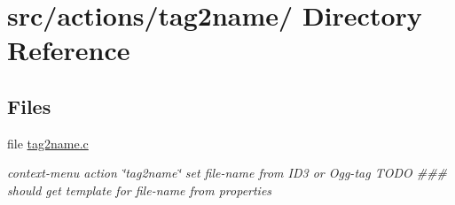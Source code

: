 \hypertarget{dir_000042}{
\section{src/actions/tag2name/ Directory Reference}
\label{dir_000042}
}
\subsection*{Files}
\begin{CompactItemize}
\item 
file \hyperlink{tag2name_8c}{tag2name.c}
\begin{CompactList}\small\item\em context-menu action \char`\"{}tag2name\char`\"{} set file-name from ID3 or Ogg-tag TODO \#\#\# should get template for file-name from properties \item\end{CompactList}

\end{CompactItemize}
